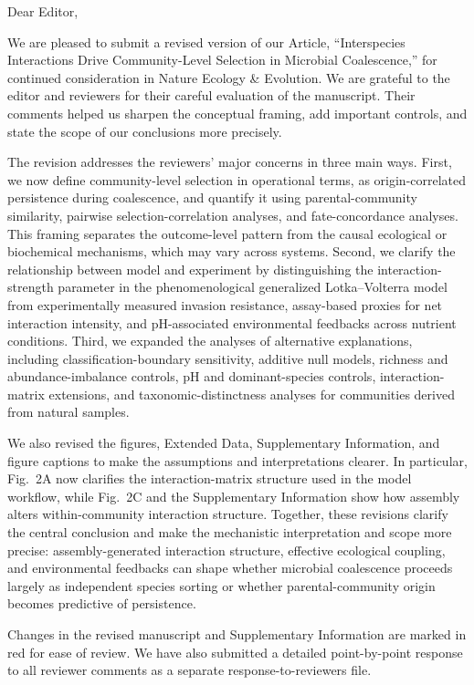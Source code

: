 \documentclass[11pt]{letter}
\begin{document}
\begin{letter}{}

\opening{Dear Editor,}

We are pleased to submit a revised version of our Article, ``Interspecies Interactions Drive Community-Level Selection in Microbial Coalescence,'' for continued consideration in Nature Ecology \& Evolution. We are grateful to the editor and reviewers for their careful evaluation of the manuscript. Their comments helped us sharpen the conceptual framing, add important controls, and state the scope of our conclusions more precisely.

The revision addresses the reviewers' major concerns in three main ways. First, we now define community-level selection in operational terms, as origin-correlated persistence during coalescence, and quantify it using parental-community similarity, pairwise selection-correlation analyses, and fate-concordance analyses. This framing separates the outcome-level pattern from the causal ecological or biochemical mechanisms, which may vary across systems. Second, we clarify the relationship between model and experiment by distinguishing the interaction-strength parameter in the phenomenological generalized Lotka--Volterra model from experimentally measured invasion resistance, assay-based proxies for net interaction intensity, and pH-associated environmental feedbacks across nutrient conditions. Third, we expanded the analyses of alternative explanations, including classification-boundary sensitivity, additive null models, richness and abundance-imbalance controls, pH and dominant-species controls, interaction-matrix extensions, and taxonomic-distinctness analyses for communities derived from natural samples.

We also revised the figures, Extended Data, Supplementary Information, and figure captions to make the assumptions and interpretations clearer. In particular, Fig.~2A now clarifies the interaction-matrix structure used in the model workflow, while Fig.~2C and the Supplementary Information show how assembly alters within-community interaction structure. Together, these revisions clarify the central conclusion and make the mechanistic interpretation and scope more precise: assembly-generated interaction structure, effective ecological coupling, and environmental feedbacks can shape whether microbial coalescence proceeds largely as independent species sorting or whether parental-community origin becomes predictive of persistence.

Changes in the revised manuscript and Supplementary Information are marked in red for ease of review. We have also submitted a detailed point-by-point response to all reviewer comments as a separate response-to-reviewers file.


\end{letter}
\end{document}
